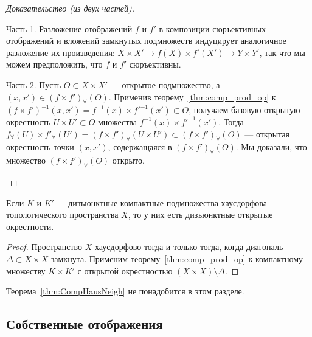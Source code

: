 \documentclass[
	extrafontsizes,
	11pt,
	hyphens,
]{memoir}
\begin{document}
\begin{proof}[Доказательство (из двух частей)]
~\begin{proofdescription}

\item[Часть 1.]
Разложение отображений \(f\) и \(f'\) в композиции сюръективных отображений и вложений замкнутых подмножеств индуцирует аналогичное разложение их произведения:
\(X \times X' \to f(X) \times f'(X') \to Y \times Y'\), так что мы можем предположить, что \(f\) и \(f'\) сюръективны.

\item[Часть 2.]
Пусть \(O \subset X \times X'\) --- открытое подмножество, а \((x,x') \in (f \times f')_\forall(O)\).
Применив теорему~\ref{thm:comp_prod_op} к \((f \times f')^{-1}(x,x') = f^{-1}(x) \times f'^{-1}(x') \subset O\), получаем базовую открытую окрестность \(U \times U' \subset O\) множества \(f^{-1}(x) \times f'^{-1}(x')\).
Тогда \(f_\forall(U) \times f'_\forall(U') = (f \times f')_\forall (U \times U') \subset (f \times f')_\forall (O)\) --- открытая окрестность точки \((x,x')\), содержащаяся в \((f \times f')_\forall (O)\).
Мы доказали, что множество \((f \times f')_\forall (O)\) открыто.
\qedhere

\end{proofdescription}
\end{proof}

\begin{theorem}
\label{thm:CompHausNeigh}
Если \(K\) и \(K'\) --- дизъюнктные компактные подмножества хаусдорфова топологического пространства \(X\), то у них есть дизъюнктные открытые окрестности.
\end{theorem}

\begin{proof}
Пространство \(X\) хаусдорфово тогда и только тогда, когда диагональ \(\Delta \subset X \times X\) замкнута.
Применим теорему~\ref{thm:comp_prod_op} к компактному множеству \(K \times K'\) с открытой окрестностью \((X \times X) \setminus \Delta\).
\end{proof}

\begin{remark}
Теорема~\ref{thm:CompHausNeigh} не понадобится в этом разделе.
\end{remark}

\subsection{Собственные отображения}
\end{document}
